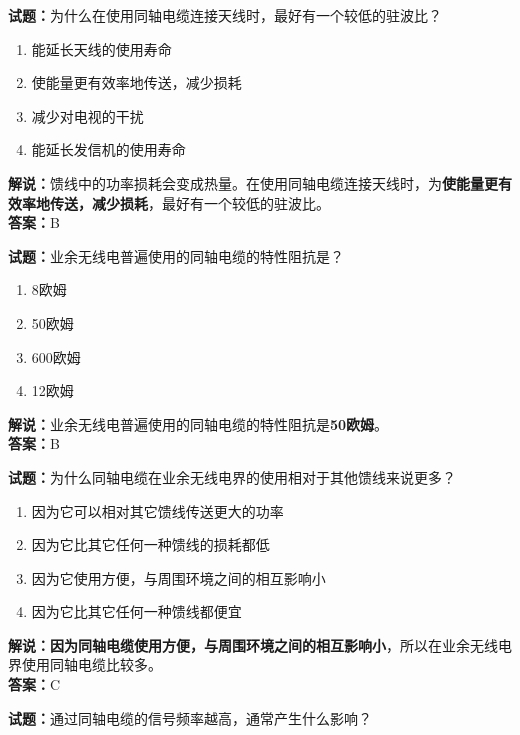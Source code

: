 \documentclass{ctexbook}
\begin{document}
\noindent\textbf{试题：}为什么在使用同轴电缆连接天线时，最好有一个较低的驻波比？

\begin{enumerate}[leftmargin=3em]
	\item 能延长天线的使用寿命
	\item 使能量更有效率地传送，减少损耗
	\item 减少对电视的干扰
	\item 能延长发信机的使用寿命
\end{enumerate}

\noindent\textbf{解说：}馈线中的功率损耗会变成热量。在使用同轴电缆连接天线时，为\textbf{使能量更有效率地传送，减少损耗}，最好有一个较低的驻波比。\\\noindent\textbf{答案：}B


\bigskip


\noindent\textbf{试题：}业余无线电普遍使用的同轴电缆的特性阻抗是？

\begin{enumerate}[leftmargin=3em]
	\item 8欧姆
	\item 50欧姆
	\item 600欧姆
	\item 12欧姆
\end{enumerate}

\noindent\textbf{解说：}业余无线电普遍使用的同轴电缆的特性阻抗是\textbf{50欧姆}。\\\noindent\textbf{答案：}B


\bigskip


\noindent\textbf{试题：}为什么同轴电缆在业余无线电界的使用相对于其他馈线来说更多？

\begin{enumerate}[leftmargin=3em]
	\item 因为它可以相对其它馈线传送更大的功率
	\item 因为它比其它任何一种馈线的损耗都低
	\item 因为它使用方便，与周围环境之间的相互影响小
	\item 因为它比其它任何一种馈线都便宜
\end{enumerate}

\noindent\textbf{解说：}\textbf{因为同轴电缆使用方便，与周围环境之间的相互影响小}，所以在业余无线电界使用同轴电缆比较多。\\\noindent\textbf{答案：}C


\bigskip


\noindent\textbf{试题：}通过同轴电缆的信号频率越高，通常产生什么影响？
\end{document}
